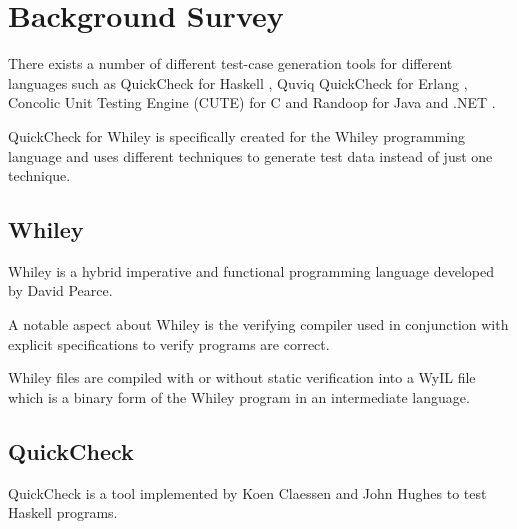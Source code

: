 \section{Background Survey}\label{section:background}


There exists a number of different test-case generation tools for different languages such as QuickCheck for Haskell \cite{QClightweight}, Quviq QuickCheck for Erlang \cite{QCFunProfit}, Concolic Unit Testing Engine (CUTE)  for C \cite{CUTE} and Randoop for Java \cite{randoopJava} and .NET  \cite{randoopAll}.


QuickCheck for Whiley is specifically created for the Whiley programming language and uses different techniques to generate test data instead of just one technique.

\subsection{Whiley}
Whiley is a hybrid imperative and functional programming language developed by David Pearce.

A notable aspect about Whiley is the verifying compiler used in conjunction with explicit specifications to verify programs are correct.


Whiley files are compiled with or without static verification into a WyIL file which is a binary form of the Whiley program in an intermediate language.





\subsection{QuickCheck}
QuickCheck is a tool implemented by Koen Claessen and John Hughes \cite{QClightweight} to test Haskell programs.

